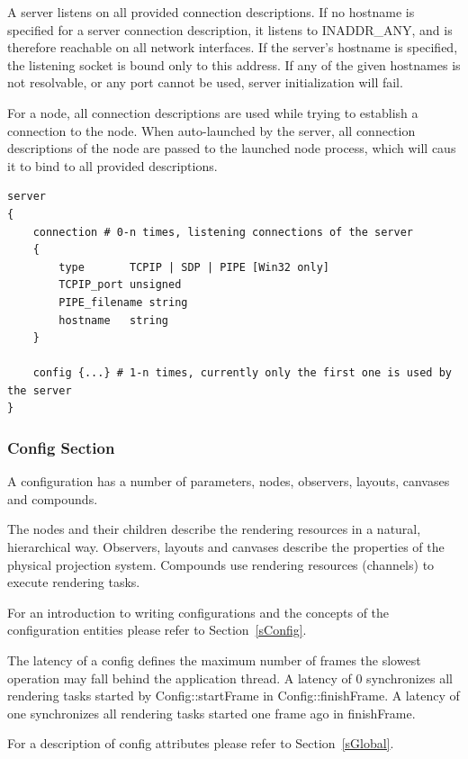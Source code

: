 \documentclass[10pt,a4]{scrartcl}
\newcommand{\sref}[1]{Section~\ref{#1}}
\begin{document}
A server listens on all provided connection descriptions. If no hostname
is specified for a server connection description, it listens to
INADDR\_ANY, and is therefore reachable on all network interfaces. If
the server's hostname is specified, the listening socket is bound only
to this address. If any of the given hostnames is not resolvable, or any
port cannot be used, server initialization will fail.

For a node, all connection descriptions are used while trying to
establish a connection to the node. When auto-launched by the server,
all connection descriptions of the node are passed to the launched node
process, which will caus it to bind to all provided descriptions.

{\footnotesize\begin{lstlisting}
server
{
    connection # 0-n times, listening connections of the server
    {
        type       TCPIP | SDP | PIPE [Win32 only]
        TCPIP_port unsigned
        PIPE_filename string
        hostname   string
    }

    config {...} # 1-n times, currently only the first one is used by the server
}
\end{lstlisting}}

\subsubsection{Config Section}

A configuration has a number of parameters, nodes, observers, layouts,
canvases and compounds.

The nodes and their children describe the rendering resources in a
natural, hierarchical way. Observers, layouts and canvases describe the
properties of the physical projection system. Compounds use rendering
resources (channels) to execute rendering tasks.

For an introduction to writing configurations and the concepts of the
configuration entities please refer to \sref{sConfig}.

The latency of a config defines the maximum number of frames the
slowest operation may fall behind the application thread. A latency of 0
synchronizes all rendering tasks started by \textsf{Config::startFrame}
in \textsf{Config::finishFrame}. A latency of one synchronizes all
rendering tasks started one frame ago in \textsf{finishFrame}.

For a description of config attributes please refer to \sref{sGlobal}.
\end{document}
